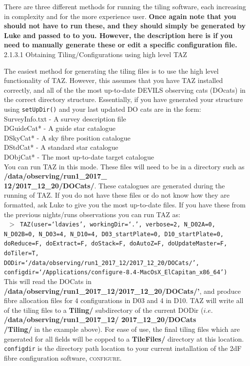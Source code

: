 \documentclass[12pt]{article}
\begin{document}
There are three different methods for running the tiling software, each increasing in complexity and for the more experience user. \textbf{\textcolor{PineGreen}{Once again note that you should not have to run these, and they should simply be generated by Luke and passed to to you. However, the description here is if you need to manually generate these or edit a specific configuration file.}}\\

\textsf{2.1.3.1 Obtaining Tiling/Configurations using high level TAZ}
\vspace{2mm}

The easiest method for generating the tiling files is to use the high level functionality of TAZ. However, this assumes that you have TAZ installed correctly, and all of the the most up-to-date DEVILS observing cats (DOcats) in the correct directory structure. Essentially, if you have generated your structure using \texttt{setUpDir()} and your last updated DO cats are in the form: \\

SurveyInfo.txt - A survey description file \\
DGuideCat* - A guide star catalogue \\
DSkyCat* - A sky fibre position catalogue \\
DStdCat* - A standard star catalogue \\
DObjCat* - The most up-to-date target catalogue \\

You can run TAZ in this mode. These files will need to be in a directory such as \textbf{/data/observing/run1\_2017\_ \\ 12/2017\_12\_20/DOCats/}. These catalogues are generated during the running of TAZ. If you do not have these files or do not know how they are formatted, ask Luke to give you the most up-to-date files. If you have these from the previous nights/runs observations you can run TAZ as: \\

\texttt{ $>$ TAZ(user=`ldavies', workingDir=`.', verbose=2, N\_D02A=0, N\_D02B=0, N\_D03=4, N\_D10=4, D03\_startPlate=0, D10\_startPlate=0, doReduce=F, doExtract=F, 
doStack=F, doAutoZ=F, doUpdateMaster=F, doTiler=T, \\
DODir=`/data/observing/run1\_2017\_12/2017\_12\_20/DOCats/', configdir=`/Applications/configure-8.4-MacOsX\_ElCapitan\_x86\_64')} \\

This will read the DOCats in \textbf{/data/observing/run1\_2017\_12/2017\_12\_20/DOCats/'}, and produce fibre allocation files for 4 configurations in D03 and 4 in D10. TAZ will write all of the tiling files to a \textbf{Tiling/} subdirectory of the current DODir ($i.e.$ \textbf{/data/observing/run1\_2017\_12/ 2017\_12\_20/DOCats \\ /Tiling/} in the example above). For ease of use, the final tiling files which are generated for all fields will be copped to a  \textbf{TileFiles/} directory at this location. \texttt{configdir} is the directory path location to your current installation of the 2dF fibre configuration software, \textsc{configure}. \\
\end{document}
